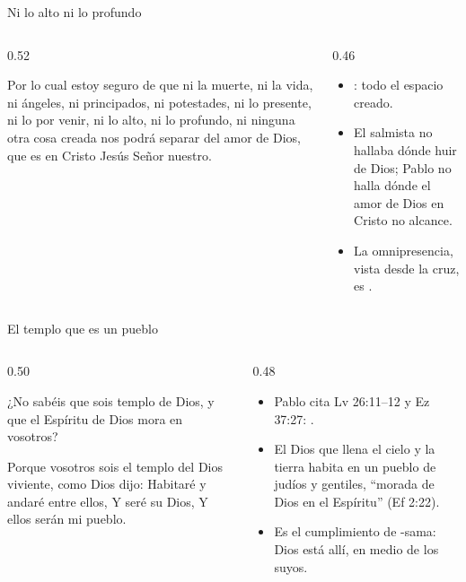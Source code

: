 \begin{frame}{Ni lo alto ni lo profundo}
\begin{columns}[c,onlytextwidth]
\begin{column}{0.52\textwidth}
\begin{cita}[fontupper=\scriptsize\itshape]Por lo cual estoy seguro de que ni la muerte, ni la vida, ni ángeles, ni principados, ni potestades, ni lo presente, ni lo por venir, ni lo alto, ni lo profundo, ni ninguna otra cosa creada nos podrá separar del amor de Dios, que es en Cristo Jesús Señor nuestro.\end{cita}
\end{column}
\begin{column}{0.46\textwidth}\small
\begin{itemize}
\item {}: todo el espacio creado.
\item El salmista no hallaba dónde huir de Dios; Pablo no halla dónde el amor de Dios en Cristo no alcance.
\item La omnipresencia, vista desde la cruz, es .
\end{itemize}
\end{column}
\end{columns}
\end{frame}

\begin{frame}{El templo que es un pueblo}
\begin{columns}[t,onlytextwidth]
\begin{column}{0.50\textwidth}
\begin{cita}[fontupper=\scriptsize\itshape]¿No sabéis que sois templo de Dios, y que el Espíritu de Dios mora en vosotros?\end{cita}
\begin{cita}[fontupper=\scriptsize\itshape]Porque vosotros sois el templo del Dios viviente, como Dios dijo: Habitaré y andaré entre ellos, Y seré su Dios, Y ellos serán mi pueblo.\end{cita}
\end{column}
\begin{column}{0.48\textwidth}\small
\begin{itemize}
\item Pablo cita Lv 26:11--12 y Ez 37:27: .
\item El Dios que llena el cielo y la tierra habita en un pueblo de judíos y gentiles, ``morada de Dios en el Espíritu'' (Ef 2:22).
\item Es el cumplimiento de \SENOR-sama: Dios está allí, en medio de los suyos.
\end{itemize}
\end{column}
\end{columns}
\end{frame}

